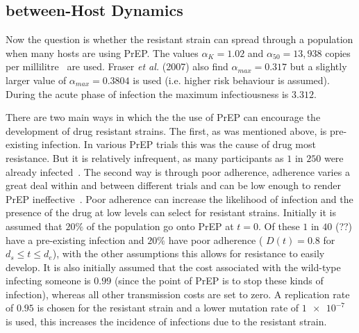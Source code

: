 \documentclass[DIV=15]{scrartcl}
\begin{document}
  

  
  
\subsection{between-Host Dynamics}  
 

Now the question is whether the resistant strain can spread through a population when many hosts are using PrEP.   The values $\alpha_K = 1.02$ and $\alpha_{50} = 13,938$ copies per millilitre~\cite{fraser2007}  are used. Fraser \textit{et al.} (2007)  also find $\alpha_{max} = 0.317$ but a slightly larger value of  $\alpha_{max}= 0.3804$ is used (i.e. higher risk behaviour is assumed).    
During the acute phase of infection the maximum infectiousness is $ 3.312$.



There are two  main ways in which the
the use  of PrEP can encourage the development of drug resistant strains. The first, as  was mentioned above, is pre-existing infection. In various PrEP trials this was the cause of  drug  most resistance. But it is relatively infrequent, 
as many participants as  $1$ in $250$ were already infected~\cite{iprex2011}. The second way is through poor adherence, adherence varies a great deal within and between different trials and can be low enough to render PrEP ineffective~\cite{corneli2014}. Poor adherence can increase  the  likelihood
of infection and the presence of the drug at low levels can select for resistant strains. %
Initially it is  assumed that  
$20\%$ of the population  go  onto PrEP at $t=0$. Of these $1$ in $40$ (??) have a pre-existing infection  and $20\%$ have poor adherence ( $D(t) = 0.8$ for $ d_s \leq t \leq d_e$), with the other assumptions this allows for resistance to easily develop. It is also initially assumed that the cost associated with the wild-type infecting someone is $0.99$  (since the point of  PrEP is to stop these kinds of infection), whereas all other transmission costs are set to zero. A replication rate of $ 0.95 $ is chosen for the resistant strain and a lower mutation rate of $ \SI{1e-7}{}$ is used, this  increases the incidence of infections due to  the resistant strain.
\end{document}
